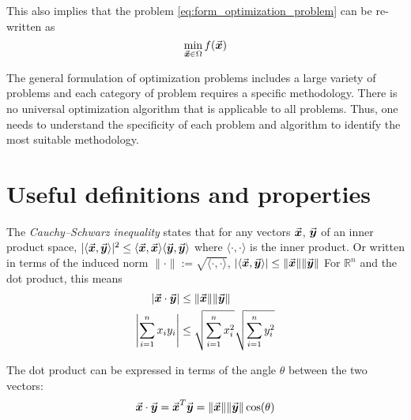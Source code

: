 This also implies that the problem \eqref{eq:form_optimization_problem} can be re-written as
\[
\min_{\vec{\boldsymbol{x}}\in\Omega} f(\vec{\boldsymbol{x}})
\]

The general formulation of optimization problems includes a large variety of problems and each category of problem requires a specific methodology. There is no universal optimization algorithm that is applicable to all problems. Thus, one needs to understand the specificity of each problem and algorithm to identify the most suitable methodology.




\clearpage
\section{Useful definitions and properties}

\begin{theorem}
  The \emph{Cauchy--Schwarz inequality} states that for any vectors \(\vec{\boldsymbol{x}}\), \(\vec{\boldsymbol{y}}\) of an inner product space,
  \(
  |\langle \vec{\boldsymbol{x}}, \vec{\boldsymbol{y}} \rangle|^{2} \leq \langle \vec{\boldsymbol{x}}, \vec{\boldsymbol{x}} \rangle \langle \vec{\boldsymbol{y}}, \vec{\boldsymbol{y}} \rangle
  \)
  where \(\langle \cdot, \cdot \rangle\) is the inner product. Or written in terms of the induced norm \(\|\cdot\|:=\sqrt{\langle \cdot, \cdot \rangle}\),
  \(
  |\langle \vec{\boldsymbol{x}}, \vec{\boldsymbol{y}} \rangle| \leq \|\vec{\boldsymbol{x}}\| \|\vec{\boldsymbol{y}}\|
  \)
  For \(\mathbb{R}^{n}\) and the dot product, this means
  \[
  \begin{aligned}
  |\vect{x} \cdot \vect{y}| &\leq \|\vect{x}\| \|\vect{y}\| \\
  \left|\sum_{i=1}^{n} x_{i}y_{i}\right| &\leq \sqrt{\sum_{i=1}^{n} x_{i}^{2}} \sqrt{\sum_{i=1}^{n} y_{i}^{2}} %
  \end{aligned}
  \]
\end{theorem}
The dot product can be expressed in terms of the angle \(\theta\) between the two vectors:
\[
\vect{x} \cdot \vect{y} = \vect{x}^{T}\vect{y} = \|\vect{x}\| \|\vect{y}\| \cos(\theta) %
\]

